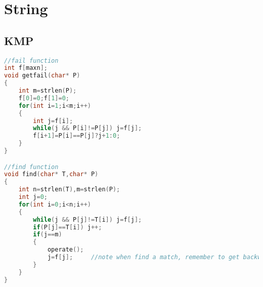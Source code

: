 \chapter{String}
 \section{KMP}
 \begin{lstlisting}[language=C++]
//fail function
int f[maxn];
void getfail(char* P)
{
    int m=strlen(P);
    f[0]=0;f[1]=0;
    for(int i=1;i<m;i++)
    {
        int j=f[i];
        while(j && P[i]!=P[j]) j=f[j];
        f[i+1]=P[i]==P[j]?j+1:0;
    }
}

//find function
void find(char* T,char* P)
{
    int n=strlen(T),m=strlen(P);
    int j=0;
    for(int i=0;i<n;i++)
    {
        while(j && P[j]!=T[i]) j=f[j];
        if(P[j]==T[i]) j++;
        if(j==m)
        {
            operate();
            j=f[j];     //note when find a match, remember to get backward along fail edge once
        }
    }
}
 \end{lstlisting}

